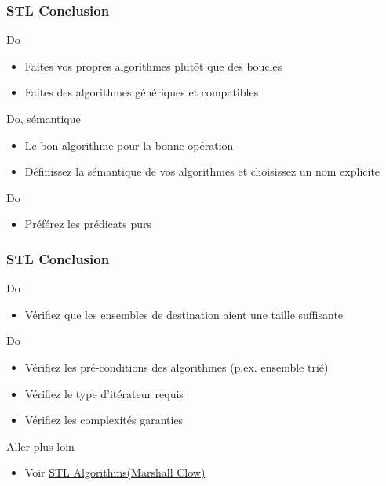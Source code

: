 \documentclass[C++.tex]{subfiles}
\begin{document}
\begin{frame}[fragile]
	\frametitle{STL Conclusion}
	\begin{exampleblock}{Do}
		\begin{itemize}
			\item Faites vos propres algorithmes plutôt que des boucles
			\item Faites des algorithmes génériques et compatibles
		\end{itemize}
	\end{exampleblock}

	\begin{exampleblock}{Do, sémantique}
		\begin{itemize}
			\item Le bon algorithme pour la bonne opération
			\item Définissez la sémantique de vos algorithmes et choisissez un nom explicite
		\end{itemize}
	\end{exampleblock}

	\begin{exampleblock}{Do}
		\begin{itemize}
			\item Préférez les prédicats purs
		\end{itemize}
	\end{exampleblock}
\end{frame}

\begin{frame}[fragile]
	\frametitle{STL Conclusion}
	\begin{exampleblock}{Do}
		\begin{itemize}
			\item Vérifiez que les ensembles de destination aient une taille suffisante
		\end{itemize}
	\end{exampleblock}

	\begin{exampleblock}{Do}
		\begin{itemize}
			\item Vérifiez les pré-conditions des algorithmes (p.ex. ensemble trié)
			\item Vérifiez le type d'itérateur requis
			\item Vérifiez les complexités garanties
		\end{itemize}
	\end{exampleblock}

	\begin{block}{Aller plus loin}
		\begin{itemize}
			\item Voir \href{https://github.com/CppCon/CppCon2016/blob/master/Presentations/STL\%20Algorithms/STL\%20Algorithms\%20-\%20Marshall\%20Clow\%20-\%20CppCon\%202016.pdf}{STL Algorithms\linklogo (Marshall Clow)}
		\end{itemize}
	\end{block}
\end{frame}
\end{document}
